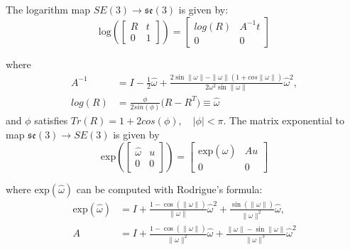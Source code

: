 \documentclass[0-suturing.tex]{subfiles}
\begin{document}
\noindent The logarithm map $SE(3) \to \mathfrak{se}(3)$ is given by:
\begin{equation}
    \text{log}\left(
        \begin{bmatrix}
            R & t \\
            0 & 1
        \end{bmatrix}
    \right)  =
    \begin{bmatrix}
        log(R) & A^{-1}t \\
        0 & 0
    \end{bmatrix}
    \label{eq:logMap}
\end{equation}

\noindent where
\begin{equation*}
\begin{aligned}
    A^{-1} &= I - \frac{1}{2}\hat{\omega} +
\frac{2\sin\|\omega\| - \|\omega\|(1+cos\|\omega\|) }{2\omega^{2} \sin\|\omega\|}\hat{\omega}^{2},  \\
log(R) &= \frac{\phi}{2sin(\phi)}\big(R - R^T\big) \equiv \hat{\omega}
\end{aligned}
\end{equation*}
and $\phi$ satisfies $Tr(R) = 1+2cos(\phi), \quad |\phi|<\pi$.
\vspace{5pt}
\noindent The matrix exponential to map $\mathfrak{se}(3) \to SE(3)$ is given by
\begin{equation}
    \text{exp}\left(
        \begin{bmatrix}
            \hat{\omega} & u \\
            0 & 0
        \end{bmatrix}
    \right)  =
    \begin{bmatrix}
        \text{exp}(\hat{\omega}) & Au \\
        0 & 0
    \end{bmatrix}
    \label{eq:expMap}
\end{equation}

\noindent where $\text{exp}(\hat{\omega})$ can be computed with Rodrigue's formula:
\begin{equation*}
\begin{aligned}
    \text{exp}(\hat{\omega}) &= I + \frac{1-\cos(\|\omega\|)}{\|\omega\|}\hat{\omega}^2 +
    \frac{\sin(\|\omega\|)}{\|\omega\|^2}\hat{\omega},\\
    A &= I + \frac{1-\cos(\|\omega\|)}{\|\omega\|^2}\hat{\omega} + \frac{\|\omega\| - \sin\|\omega\|}{\|\omega\|^3}\hat{\omega}^2
\end{aligned}
\end{equation*}
\end{document}
